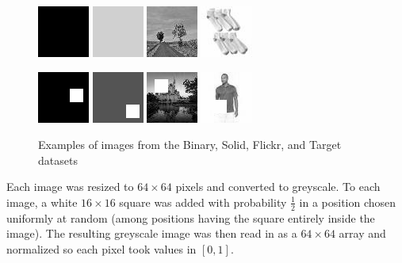 \documentclass{article}
\newcommand{\dataset}[1]{\textsf{#1}}
\begin{document}
  \begin{figure}
    \centering
      \includegraphics{img/black}\quad
      \includegraphics{img/solid}\quad
      \includegraphics{img/flickr}\quad
      \includegraphics{img/target}\bigskip

      \includegraphics{img/black+rect}\quad
      \includegraphics{img/solid+rect}\quad
      \includegraphics{img/flickr+rect}\quad
      \includegraphics{img/target+rect}
      \caption{Examples of images from the \dataset{Binary}, \dataset{Solid}, \dataset{Flickr}, and \dataset{Target} datasets}
  \end{figure}

  Each image was resized to $64\times 64$ pixels and converted to greyscale. To each image, a white $16\times 16$ square was added with probability $\frac{1}{2}$ in a position chosen uniformly at random (among positions having the square entirely inside the image). The resulting greyscale image was then read in as a $64\times 64$ array and normalized so each pixel took values in $[0, 1]$.
\end{document}
